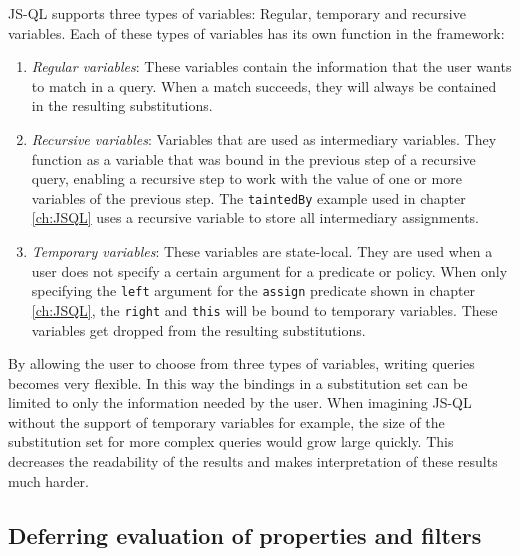 JS-QL supports three types of variables: Regular, temporary and recursive variables. Each of these types of variables has its own function in the framework:
\begin{enumerate}
\item \textit{Regular variables}: These variables contain the information that the user wants to match in a query. When a match succeeds, they will always be contained in the resulting substitutions.
\item \textit{Recursive variables}: Variables that are used as intermediary variables. They function as a variable that was bound in the previous step of a recursive query, enabling a recursive step to work with the value of one or more variables of the previous step. The \texttt{taintedBy} example used in chapter \ref{ch:JSQL} uses a recursive variable to store all intermediary assignments.
\item \textit{Temporary variables}: These variables are state-local. They are used when a user does not specify a certain argument for a predicate or policy. When only specifying the \texttt{left} argument for the \texttt{assign} predicate shown in chapter \ref{ch:JSQL}, the \texttt{right} and \texttt{this} will be bound to temporary variables. These variables get dropped from the resulting substitutions.
\end{enumerate}

\noindent By allowing the user to choose from three types of variables, writing queries becomes very flexible. In this way the bindings in a substitution set can be limited to only the information needed by the user. When imagining JS-QL without the support of temporary variables for example, the size of the substitution set for more complex queries would grow large quickly. This decreases the readability of the results and makes interpretation of these results much harder.

\subsection*{Deferring evaluation of properties and filters}

